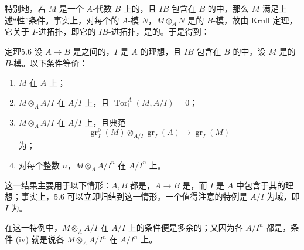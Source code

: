 特别地，若 $M$ 是一个 $A$-代数 $B$ 上的，且 $IB$ 包含在 $B$ 的中，那么 $M$ 满足上述“性”条件。事实上，对每个的 $A$-模 $N$，$M\otimes_A N$ 是的 $B$-模，故由 Krull 定理，它关于 $I$-进拓扑，即它的 $IB$-进拓扑，是的。于是得到：

\begin{SGAresult}{定理}{5.6}
设 $A\to B$ 是之间的，$I$ 是 $A$ 的理想，且 $IB$ 包含在 $B$ 的中。设 $M$ 是的 $B$-模。以下条件等价：
\begin{enumerate}
\item[(i)] $M$ 在 $A$ 上；
\item[(ii)] $M\otimes_A A/I$ 在 $A/I$ 上，且 $\operatorname{Tor}_1^A(M,A/I)=0$；
\item[(iii)] $M\otimes_A A/I$ 在 $A/I$ 上，且典范
\[
\operatorname{gr}_I^0(M)\otimes_{A/I}\operatorname{gr}_I(A)
\longrightarrow\operatorname{gr}_I(M)
\]
为；
\item[(iv)] 对每个整数 $n$，$M\otimes_A A/I^n$ 在 $A/I^n$ 上。
\end{enumerate}
\end{SGAresult}
这一结果主要用于以下情形：$A,B$ 都是，$A\to B$ 是，而 $I$ 是 $A$ 中包含于其的理想；事实上，5.6 可以立即归结到这一情形。一个值得注意的特例是 $A/I$ 为域，即 $I$ 为。

在这一特例中，$M\otimes_A A/I$ 在 $A/I$ 上的条件便是多余的；又因为各 $A/I^n$ 都是，条件 (iv) 就是说各 $M\otimes_A A/I^n$ 在 $A/I^n$ 上。

